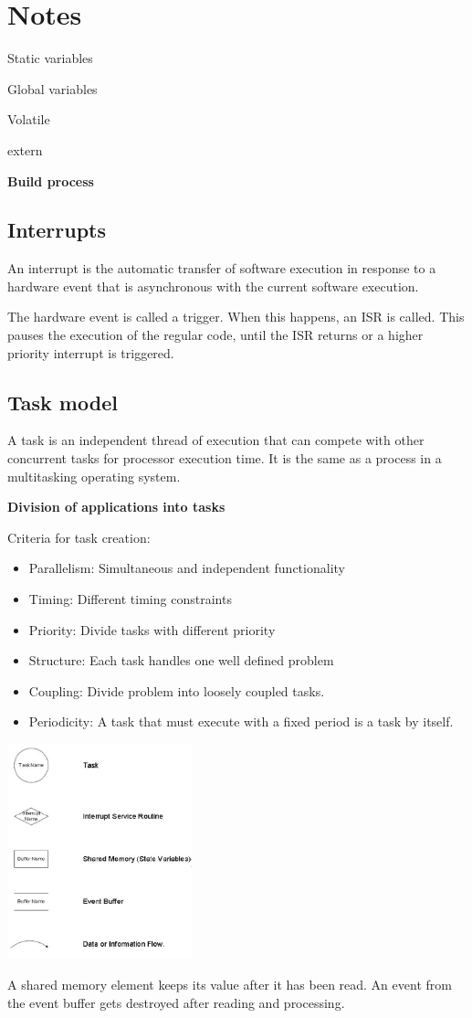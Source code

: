 \section{Notes}





Static variables

Global variables

Volatile

extern


\textbf{Build process}



\subsection{Interrupts}
An interrupt is the automatic transfer of software execution in response to a hardware event that is asynchronous with the current software execution.

The hardware event is called a trigger. When this happens, an ISR is called.
This pauses the execution of the regular code, until the ISR returns or a
higher priority interrupt is triggered.


\subsection{Task model}
A task is an independent thread of execution that can compete with
other concurrent tasks for processor execution time.
It is the same as a process in a multitasking operating system.

\textbf{Division of applications into tasks}

Criteria for task creation:

\begin{itemize}
	\item{Parallelism: Simultaneous and independent functionality}
	\item{Timing: Different timing constraints}
	\item{Priority: Divide tasks with different priority}
	\item{Structure: Each task handles one well defined problem}
	\item{Coupling: Divide problem into loosely coupled tasks.}
	\item{Periodicity: A task that must execute with a fixed period is a task by itself.}
\end{itemize}

\begin{center}
	\includegraphics[width=0.4\textwidth]{images/taskDiagramComponents.png}
\end{center}

A shared memory element keeps its value after it has been read.
An event from the event buffer gets destroyed after reading and processing.

